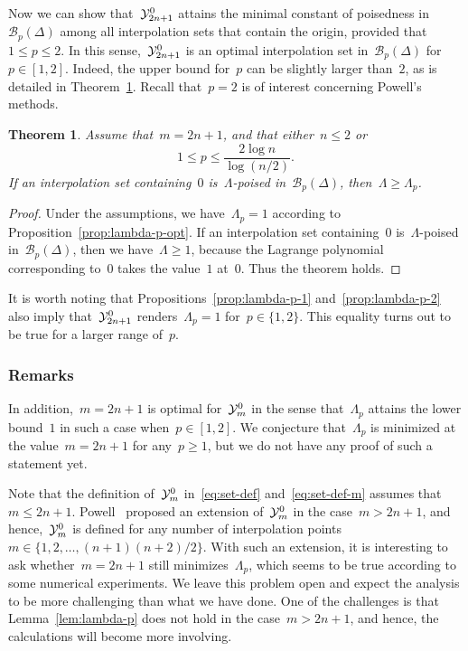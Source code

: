 \documentclass[draft]{article}
\numberwithin{equation}{section}
\theoremstyle{definition}
\theoremstyle{plain}
\newtheorem{theorem}{Theorem}[section]
\theoremstyle{remark}
\newcommand*{\set}[2][]{#1\{#2#1\}}
\newcommand*{\xpt}[1][]{\mathcal{Y}\ifblank{#1}{}{^{#1}}}
\begin{document}
Now we can show that~$\xpt[0]_{2n+1}$ attains the minimal constant of poisedness in~$\mathcal{B}_p(\Delta)$ among all interpolation sets that contain the origin, provided that~$1 \le p\le 2$.
In this sense,~$\xpt[0]_{2n + 1}$ is an optimal interpolation set in~$\mathcal{B}_p(\Delta)$ for~$p \in [1, 2]$.
Indeed, the upper bound for~$p$ can be slightly larger than~$2$, as is detailed in Theorem~\ref{th:optimset}.
Recall that~$p=2$ is of interest concerning Powell's methods.
\begin{theorem}
    \label{th:optimset}
    Assume that~$m=2n+1$, and that either~$n\le 2$ or
    \[
        1 \le p \le \frac{2\log n}{\log (n/2)}.
    \]
    If an interpolation set containing~$0$ is~$\Lambda$-poised in~$\mathcal{B}_p(\Delta)$, then~$\Lambda \ge \Lambda_p$.
\end{theorem}

\begin{proof}
    Under the assumptions, we have~$\Lambda_p = 1$ according to Proposition~\ref{prop:lambda-p-opt}.
    If an interpolation set containing~$0$ is~$\Lambda$-poised in~$\mathcal{B}_p(\Delta)$, then we
    have~$\Lambda \ge 1$, because the Lagrange polynomial corresponding to~$0$ takes the value~$1$ at~$0$.
    Thus the theorem holds.
\end{proof}
It is worth noting that Propositions~\ref{prop:lambda-p-1} and~\ref{prop:lambda-p-2} also imply that~$\xpt[0]_{2n+1}$ renders~$\Lambda_p = 1$ for~$p \in \set{1, 2}$.
This equality turns out to be true for a larger range of~$p$.



\subsubsection{Remarks}


In addition,~$m = 2n + 1$ is optimal for~$\xpt[0]_m$ in the sense that~$\Lambda_p$ attains the lower bound~$1$ in such a case when~$p \in [1, 2]$.
We conjecture that~$\Lambda_p$ is minimized at the value~$m = 2n + 1$ for any~$p \ge 1$, but we do not have any proof of such a statement yet.

Note that the definition of~$\xpt[0]_m$ in~\eqref{eq:set-def} and~\eqref{eq:set-def-m} assumes that~$m \le 2n + 1$.
Powell~\cite{Powell_2006} proposed an extension of~$\xpt[0]_m$ in the case~$m > 2n + 1$, and hence,~$\xpt[0]_m$ is defined for any number of interpolation points~$m \in \set{1, 2, \dots, (n + 1) (n + 2) / 2}$.
With such an extension, it is interesting to ask whether~$m = 2n + 1$ still minimizes~$\Lambda_p$, which seems to be true according to some numerical experiments.
We leave this problem open and expect the analysis to be more challenging than what we have done.
One of the challenges is that Lemma~\ref{lem:lambda-p} does not hold in the case~$m > 2n + 1$, and hence, the calculations will become more involving.
\end{document}
